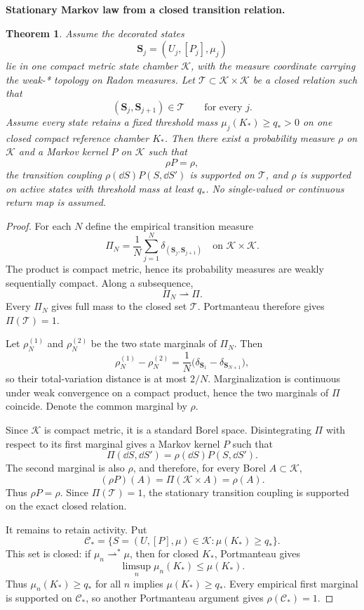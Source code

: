\documentclass[11pt]{article}
\newtheorem{theorem}{Theorem}[section]
\theoremstyle{definition}\newtheorem{definition}[theorem]{Definition}
\theoremstyle{remark}\newtheorem{remark}[theorem]{Remark}
\begin{document}
\medskip
\noindent\textbf{Stationary Markov law from a closed transition relation.}
\begin{theorem}\label{thm:stationary-law}
Assume the decorated states
\[
\mathbf S_j=(U_j,[P_j],\mu_j)
\]
lie in one compact metric state chamber $\mathcal K$, with the measure
coordinate carrying the weak-* topology on Radon measures.  Let
$\mathcal T\subset\mathcal K\times\mathcal K$ be a closed relation such that
\[
(\mathbf S_j,\mathbf S_{j+1})\in\mathcal T
\qquad\text{for every }j.
\]
Assume every state retains a fixed threshold mass
$\mu_j(K_*)\ge q_*>0$ on one closed compact reference chamber $K_*$.  Then
there exist a probability measure $\rho$ on $\mathcal K$ and a Markov kernel
$P$ on $\mathcal K$ such that
\[
\boxed{\rho P=\rho,}
\]
the transition coupling $\rho(\dd S)P(S,\dd S')$ is supported on
$\mathcal T$, and $\rho$ is supported on active states with threshold mass at
least $q_*$.  No single-valued or continuous return map is assumed.
\end{theorem}
\begin{proof}
For each $N$ define the empirical transition measure
\[
\Pi_N=\frac1N\sum_{j=1}^N
\delta_{(\mathbf S_j,\mathbf S_{j+1})}
\quad\text{on }\mathcal K\times\mathcal K.
\]
The product is compact metric, hence its probability measures are weakly
sequentially compact.  Along a subsequence,
\[
\Pi_N\rightharpoonup\Pi.
\]
Every $\Pi_N$ gives full mass to the closed set $\mathcal T$.  Portmanteau
therefore gives $\Pi(\mathcal T)=1$.

Let $\rho_N^{(1)}$ and $\rho_N^{(2)}$ be the two state marginals of $\Pi_N$.
Then
\[
\rho_N^{(1)}-\rho_N^{(2)}
=\frac1N\bigl(\delta_{\mathbf S_1}-\delta_{\mathbf S_{N+1}}\bigr),
\]
so their total-variation distance is at most $2/N$.  Marginalization is
continuous under weak convergence on a compact product, hence the two
marginals of $\Pi$ coincide.  Denote the common marginal by $\rho$.

Since $\mathcal K$ is compact metric, it is a standard Borel space.
Disintegrating $\Pi$ with respect to its first marginal gives a Markov kernel
$P$ such that
\[
\Pi(\dd S,\dd S')=\rho(\dd S)P(S,\dd S').
\]
The second marginal is also $\rho$, and therefore, for every Borel
$A\subset\mathcal K$,
\[
(\rho P)(A)
=\Pi(\mathcal K\times A)
=\rho(A).
\]
Thus $\rho P=\rho$.  Since $\Pi(\mathcal T)=1$, the stationary transition
coupling is supported on the exact closed relation.

It remains to retain activity.  Put
\[
\mathcal C_*
=\{S=(U,[P],\mu)\in\mathcal K:\mu(K_*)\ge q_*\}.
\]
This set is closed: if $\mu_n\rightharpoonup^*\mu$, then for closed $K_*$,
Portmanteau gives
\[
\limsup_n\mu_n(K_*)\le\mu(K_*).
\]
Thus $\mu_n(K_*)\ge q_*$ for all $n$ implies $\mu(K_*)\ge q_*$.  Every
empirical first marginal is supported on $\mathcal C_*$, so another
Portmanteau argument gives $\rho(\mathcal C_*)=1$.
\end{proof}
\end{document}
